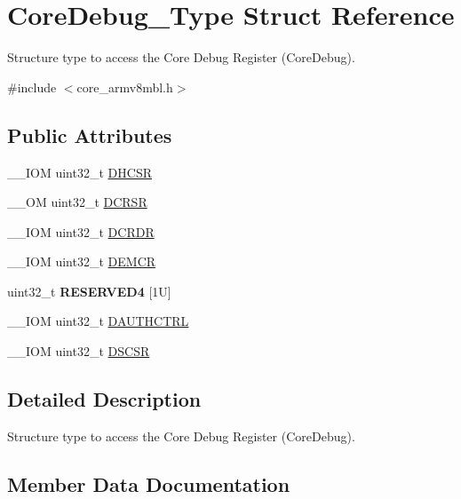 \hypertarget{struct_core_debug___type}{}\section{Core\+Debug\+\_\+\+Type Struct Reference}
\label{struct_core_debug___type}


Structure type to access the Core Debug Register (Core\+Debug).  




{\ttfamily \#include $<$core\+\_\+armv8mbl.\+h$>$}

\subsection*{Public Attributes}
\begin{DoxyCompactItemize}
\item 
\+\_\+\+\_\+\+I\+OM uint32\+\_\+t \mbox{\hyperlink{struct_core_debug___type_ad63554e4650da91a8e79929cbb63db66}{D\+H\+C\+SR}}
\item 
\+\_\+\+\_\+\+OM uint32\+\_\+t \mbox{\hyperlink{struct_core_debug___type_af907cf64577eaf927dac6787df6dd98b}{D\+C\+R\+SR}}
\item 
\+\_\+\+\_\+\+I\+OM uint32\+\_\+t \mbox{\hyperlink{struct_core_debug___type_aab3cc92ef07bc1f04b3a3aa6db2c2d55}{D\+C\+R\+DR}}
\item 
\+\_\+\+\_\+\+I\+OM uint32\+\_\+t \mbox{\hyperlink{struct_core_debug___type_aeb3126abc4c258a858f21f356c0df6ee}{D\+E\+M\+CR}}
\item 
\mbox{\label{struct_core_debug___type_ac965e9b3abb1519676f2a6a959eaedb2}} 
uint32\+\_\+t {\bfseries R\+E\+S\+E\+R\+V\+E\+D4} \mbox{[}1\+U\mbox{]}
\item 
\+\_\+\+\_\+\+I\+OM uint32\+\_\+t \mbox{\hyperlink{struct_core_debug___type_a1b319a8279b9ff2572ab5391dba5bb88}{D\+A\+U\+T\+H\+C\+T\+RL}}
\item 
\+\_\+\+\_\+\+I\+OM uint32\+\_\+t \mbox{\hyperlink{struct_core_debug___type_ad9fa5e915e038e20b9be88d54d432fb8}{D\+S\+C\+SR}}
\end{DoxyCompactItemize}


\subsection{Detailed Description}
Structure type to access the Core Debug Register (Core\+Debug). 

\subsection{Member Data Documentation}
\mbox{\label{struct_core_debug___type_a1b319a8279b9ff2572ab5391dba5bb88}} 
